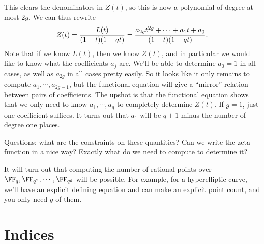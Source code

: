 This clears the denominators in \(Z(t)\), so this is now a polynomial of
degree at most \(2g\). We can thus rewrite
\begin{align*}  
Z(t) = {L(t) \over (1-t)(1-qt)} = {a_{2g} t^{2g} + \cdots + a_1 t + a_0 \over (1-t)(1-qt)}
.\end{align*} Note that if we know \(L(t)\), then we know \(Z(t)\), and
in particular we would like to know what the coefficients \(a_j\) are.
We'll be able to determine \(a_0 = 1\) in all cases, as well as
\(a_{2g}\) in all cases pretty easily. So it looks like it only remains
to compute \(a_1, \cdots, a_{2g-1}\), but the functional equation will
give a ``mirror'' relation between pairs of coefficients. The upshot is
that the functional equation shows that we only need to know
\(a_1, \cdots, a_g\) to completely determine \(Z(t)\). If \(g=1\), just
one coefficient suffices. It turns out that \(a_1\) will be \(q+1\)
minus the number of degree one places.

Questions: what are the constraints on these quantities? Can we write
the zeta function in a nice way? Exactly what do we need to compute to
determine it?

It will turn out that computing the number of rational points over
\(\FF_{q}, \FF_{q^2}, \cdots, \FF_{q^g}\) will be possible. For example,
for a hyperelliptic curve, we'll have an explicit defining equation and
can make an explicit point count, and you only need \(g\) of them.

\section{Indices}
\newpage

\renewcommand{\listtheoremname}{Definitions}
\listoftheorems[ignoreall,show={definition}, numwidth=3.5em]

\renewcommand{\listtheoremname}{Theorems}
\listoftheorems[ignoreall,show={theorem,proposition}, numwidth=3.5em]

\renewcommand{\listtheoremname}{Exercises}
\listoftheorems[ignoreall,show={exercise}, numwidth=3.5em]

\listoffigures


\printbibliography[title=Bibliography]




